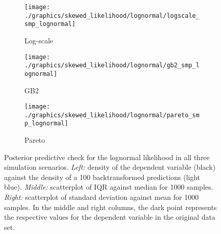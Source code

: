 \begin{figure}
    \begin{subfigure}{\textwidth}
        \texttt{[image: ./graphics/skewed\_likelihood/lognormal/logscale\_smp\_lognormal]}
        \caption{Log-scale}
    \end{subfigure}
    \newline
    \begin{subfigure}{\textwidth}
        \texttt{[image: ./graphics/skewed\_likelihood/lognormal/gb2\_smp\_lognormal]}
        \caption{GB2}
    \end{subfigure}
    \newline
    \begin{subfigure}{\textwidth}
        \texttt{[image: ./graphics/skewed\_likelihood/lognormal/pareto\_smp\_lognormal]}
        \caption{Pareto}
    \end{subfigure}
    \caption[Posterior predictive check for the lognormal likelihood in all three simulation scenarios.]{Posterior predictive check for the lognormal likelihood in all three simulation scenarios. \textit{Left:} density of the dependent variable (black) against the  density of a 100 backtransformed predictions (light blue). \textit{Middle:} scatterplot of IQR against median for 1000 samples. \textit{Right:} scatterplot of standard deviation against mean for 1000 samples. In the middle and right columns, the dark point represents the respective values for the dependent variable in the original data set.}
    \label{fig:ppc_lognormal}
\end{figure}

